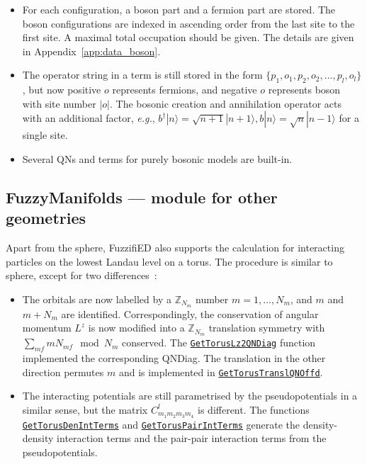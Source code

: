 \documentclass{timesjhep}
\begin{document}
\begin{itemize}
    \item For each configuration, a boson part and a fermion part are stored. The boson configurations are indexed in ascending order from the last site to the first site. A maximal total occupation should be given. The details are given in Appendix~\ref{app:data_boson}.
    \item The operator string in a term is still stored in the form $\{p_1,o_1,p_2,o_2,\dots,p_l,o_l\}$, but now positive $o$ represents fermions, and negative $o$ represents boson with site number $|o|$. The bosonic creation and annihilation operator acts with an additional factor, \textit{e.g.}, $b^\dagger|n\rangle=\sqrt{n+1}|n+1\rangle,b|n\rangle=\sqrt{n}|n-1\rangle$ for a single site.
    \item Several QNs and terms for purely bosonic models are built-in.
\end{itemize}

\subsection{FuzzyManifolds --- module for other geometries}
\label{sec:ed_manifolds}

Apart from the sphere, FuzzifiED also supports the calculation for interacting particles on the lowest Landau level on a torus. The procedure is similar to sphere, except for two differences~:
\begin{itemize}
    \item The orbitals are now labelled by a $\mathbb{Z}_{N_m}$ number $m=1,\dots,N_m$, and $m$ and $m+N_m$ are identified. Correspondingly, the conservation of angular momentum $L^z$ is now modified into a $\mathbb{Z}_{N_m}$ translation symmetry with $\sum_{mf}mN_{mf}\mod N_m$ conserved. The \href{https://docs.fuzzified.world/manifolds/\#FuzzifiED.FuzzyManifolds.GetTorusLz2QNDiag-Tuple{Int64,\%20Int64}}{\lstinline|GetTorusLz2QNDiag|} function implemented the corresponding QNDiag. The translation in the other direction permutes $m$ and is implemented in \href{https://docs.fuzzified.world/manifolds/\#FuzzifiED.FuzzyManifolds.GetTorusTranslQNOffd-Tuple{Int64,\%20Int64}}{\lstinline|GetTorusTranslQNOffd|}.
    \item The interacting potentials are still parametrised by the pseudopotentials in a similar sense, but the matrix $C_{m_1m_2m_3m_4}^l$ is different. The functions \href{https://docs.fuzzified.world/manifolds/\#FuzzifiED.FuzzyManifolds.GetTorusDenIntTerms}{\lstinline|GetTorusDenIntTerms|} and \href{https://docs.fuzzified.world/manifolds/\#FuzzifiED.FuzzyManifolds.GetTorusPairIntTerms}{\lstinline|GetTorusPairIntTerms|} generate the density-density interaction terms and the pair-pair interaction terms from the pseudopotentials.
\end{itemize}
\end{document}
